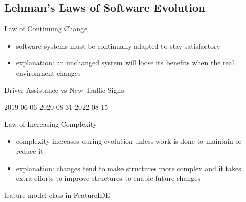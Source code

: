 \subsection{Lehman's Laws of Software Evolution}
\begin{frame}{\insertsubsection}
	\begin{fancycolumns}
		\begin{definition}{Law of Continuing Change\mysource{\lehmanslaws}}
			\begin{itemize}
				\item software systems must be continually adapted to stay satisfactory %
				\item explanation: an unchanged system will loose its benefits when the real environment changes
			\end{itemize}
		\end{definition}
		\begin{example}{Driver Assistance vs New Traffic Signs}
			\begin{fancycolumns}[b,columns=3,animation=none]
				\centering{}
				2019-06-06
			\nextcolumn
				\centering{}
				2020-08-31
			\nextcolumn
				\centering{}
				2022-08-15
			\end{fancycolumns}
		\end{example}
		\nextcolumn
		\begin{definition}{Law of Increasing Complexity\mysource{\lehmanslaws}}
			\begin{itemize}
				\item complexity increases during evolution unless work is done to maintain or reduce it %
				\item explanation: changes tend to make structures more complex and it takes extra efforts to improve structures to enable future changes
			\end{itemize}
		\end{definition}
		\begin{example}{}
			feature model class in FeatureIDE
		\end{example}
	\end{fancycolumns}
\end{frame}

